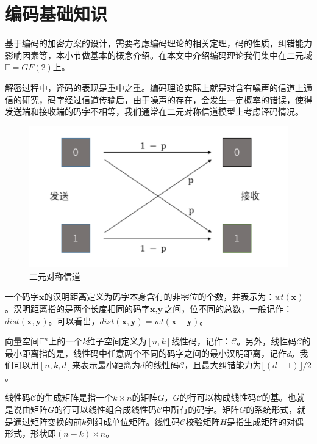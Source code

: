 \section{编码基础知识}
基于编码的加密方案的设计，需要考虑编码理论的相关定理，码的性质，纠错能力影响因素等，本小节做基本的概念介绍。在本文中介绍编码理论我们集中在二元域$\mathbb{F} = GF(2)$上。

解密过程中，译码的表现是重中之重。编码理论实际上就是对含有噪声的信道上通信的研究，码字经过信道传输后，由于噪声的存在，会发生一定概率的错误，使得发送端和接收端的码字不相等，我们通常在二元对称信道模型上考虑译码情况。

\begin{figure}[H]
	\centering
	\includegraphics[width=12 cm]{fig/binarysymmetricchannel.pdf}
	\caption{二元对称信道} %
	\label{fig:binarysymmetricchannel_pdf}
\end{figure}

\begin{define}[汉明重量与汉明距离]
	一个码字$\textbf{x}$的汉明距离定义为码字本身含有的非零位的个数，并表示为：$wt(\textbf{x})$。汉明距离指的是两个长度相同的码字$\textbf{x}, \textbf{y}$之间，位不同的总数，一般记作：$dist(\textbf{x}, \textbf{y})$。可以看出，$dist(\textbf{x}, \textbf{y}) = wt(\textbf{x} - \textbf{y})$。
\end{define}

\begin{define}[线性码]
	向量空间$\mathbb{F}^n$上的一个$k$维子空间定义为$[n, k]$线性码，记作：$\mathcal{C}$。另外，线性码$\mathcal{C}$的最小距离指的是，线性码中任意两个不同的码字之间的最小汉明距离，记作$d$。我们可以用$[n, k, d]$来表示最小距离为$d$的线性码$\mathcal{C}$，且最大纠错能力为$\lfloor(d - 1)\rfloor/2$。
\end{define}

\begin{define}[生成矩阵与校验矩阵]
	线性码$\mathcal{C}$的生成矩阵是指一个$k \times n$的矩阵$G$，$G$的行可以构成线性码$\mathcal{C}$的基。也就是说由矩阵$G$的行可以线性组合成线性码$\mathcal{C}$中所有的码字。矩阵$G$的系统形式，就是通过矩阵变换的前$k$列组成单位矩阵。线性码$\mathcal{C}$校验矩阵$H$是指生成矩阵的对偶形式，形状即$(n - k) \times n$。	
\end{define}

